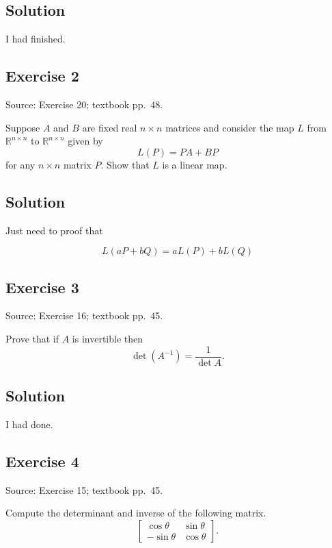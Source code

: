 \documentclass[12pt,a4paper]{article}
\newlength{\questionroom}
\newenvironment{questionprompt}{%
  \begin{lrbox}{\questionbox}\begin{minipage}{\linewidth}%
}{%
  \end{minipage}\end{lrbox}%
  \setlength{\questionroom}{\dimexpr\ht\questionbox+\dp\questionbox+5.2cm\relax}%
  \ifdim\questionroom>\textheight\setlength{\questionroom}{\textheight}\fi
  \Needspace{\questionroom}%
  \noindent\usebox{\questionbox}\par
}
\begin{document}
\subsection*{Solution}


I had finished.


\vspace{3.5cm}



\begin{questionprompt}
\section*{Exercise 2}
\label{practice:2}
{\small Source: Exercise 20; textbook pp.~48.}\par
Suppose $A$ and $B$ are fixed real $n\times n$ matrices and consider the map $L$ from $\mathbb R^{n\times n}$ to $\mathbb R^{n\times n}$ given by
\[L(P)=PA+BP\]
for any $n\times n$ matrix $P$. Show that $L$ is a linear map.
\end{questionprompt}
\subsection*{Solution}

Just need to proof that

\[
L(aP + bQ) = aL(P) + bL(Q)
\]


\vspace{3.5cm}


\begin{questionprompt}
\section*{Exercise 3}
\label{practice:3}
{\small Source: Exercise 16; textbook pp.~45.}\par
Prove that if $A$ is invertible then
\[\det(A^{-1})=\frac{1}{\det A}.\]
\end{questionprompt}
\subsection*{Solution}

I had done.
\vspace{3.5cm}


\begin{questionprompt}
\section*{Exercise 4}
\label{practice:4}
{\small Source: Exercise 15; textbook pp.~45.}\par
Compute the determinant and inverse of the following matrix.
\[\begin{bmatrix}\cos\theta&\sin\theta\\-\sin\theta&\cos\theta\end{bmatrix}.\]
\end{questionprompt}
\end{document}
